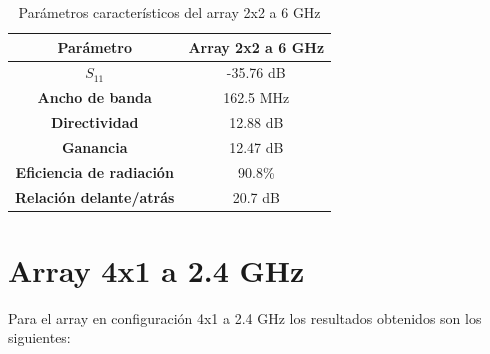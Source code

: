 \begin{table}[H]
  
   
   \small %
   \centering %
   \begin{tabular}{c c} %
   \toprule[\heavyrulewidth]\toprule[\heavyrulewidth]
   \textbf{Parámetro} & \textbf{Array 2x2 a 6 GHz} \\ 
   \midrule
   \textbf{$S_{11}$} & -35.76 dB \\
   \textbf{Ancho de banda} & 162.5 MHz \\
   \textbf{Directividad} & 12.88 dB \\
   \textbf{Ganancia} & 12.47 dB \\
   \textbf{Eficiencia de radiación} & 90.8\% \\
   \textbf{Relación delante/atrás} & 20.7 dB \\

   \bottomrule[\heavyrulewidth] 
   \end{tabular}
   
   \caption{Parámetros característicos del array 2x2 a 6 GHz} 
   \label{tab:res2x22}
\end{table}




















\section{Array 4x1 a 2.4 GHz}
\par Para el array en configuración 4x1 a 2.4 GHz los resultados obtenidos son los siguientes:

